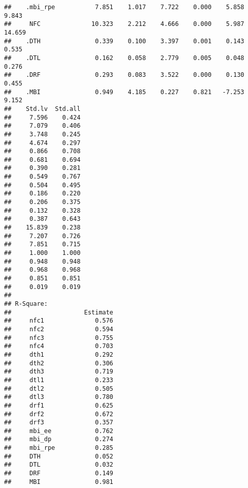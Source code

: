 \documentclass[
  english,
  man]{apa6}
\begin{document}
\begin{verbatim}
##    .mbi_rpe           7.851    1.017    7.722    0.000    5.858    9.843
##     NFC              10.323    2.212    4.666    0.000    5.987   14.659
##    .DTH               0.339    0.100    3.397    0.001    0.143    0.535
##    .DTL               0.162    0.058    2.779    0.005    0.048    0.276
##    .DRF               0.293    0.083    3.522    0.000    0.130    0.455
##    .MBI               0.949    4.185    0.227    0.821   -7.253    9.152
##    Std.lv  Std.all
##     7.596    0.424
##     7.079    0.406
##     3.748    0.245
##     4.674    0.297
##     0.866    0.708
##     0.681    0.694
##     0.390    0.281
##     0.549    0.767
##     0.504    0.495
##     0.186    0.220
##     0.206    0.375
##     0.132    0.328
##     0.387    0.643
##    15.839    0.238
##     7.207    0.726
##     7.851    0.715
##     1.000    1.000
##     0.948    0.948
##     0.968    0.968
##     0.851    0.851
##     0.019    0.019
## 
## R-Square:
##                    Estimate
##     nfc1              0.576
##     nfc2              0.594
##     nfc3              0.755
##     nfc4              0.703
##     dth1              0.292
##     dth2              0.306
##     dth3              0.719
##     dtl1              0.233
##     dtl2              0.505
##     dtl3              0.780
##     drf1              0.625
##     drf2              0.672
##     drf3              0.357
##     mbi_ee            0.762
##     mbi_dp            0.274
##     mbi_rpe           0.285
##     DTH               0.052
##     DTL               0.032
##     DRF               0.149
##     MBI               0.981
\end{verbatim}
\end{document}
